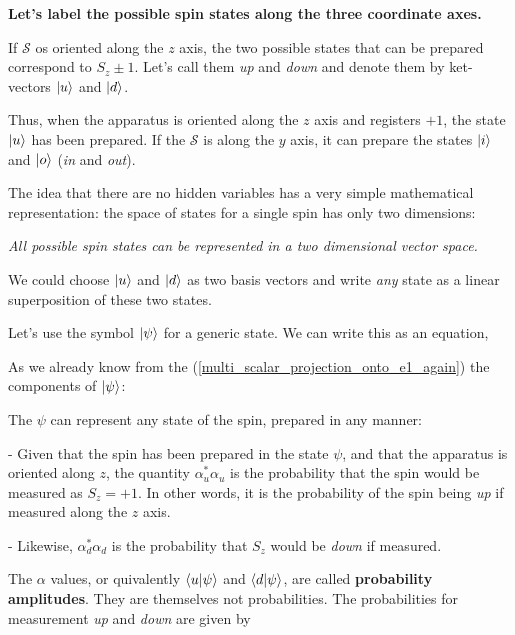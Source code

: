 \documentclass{article}
\begin{document}
\textbf{Let's label the possible spin states along the three coordinate axes.}

If $\mathcal{S}$ os oriented along the $z$ axis, the two possible states that can be prepared correspond to $S_z \pm 1$. Let's call them \textit{up} and \textit{down} and denote them by ket-vectors $\ket{u}$ and $\ket{d}$. 

Thus, when the apparatus is oriented along the $z$ axis and registers $+1$, the state $\ket{u}$ has been prepared. If the $\mathcal{S}$ is along the $y$ axis, it can prepare the states $\ket{i}$ and $\ket{o}$ (\textit{in} and \textit{out}).

The idea that there are no hidden variables has a very simple mathematical representation: the space of states for a single spin has only two dimensions:

\textit{All possible spin states can be represented in a two dimensional vector space.}

We could choose $\ket{u}$ and $\ket{d}$ as two basis vectors and write \textit{any} state as a linear superposition of these two states.

Let's use the symbol $\ket{\psi}$ for a generic state. We can write this as an equation,


As we already know from the (\ref{multi_scalar_projection_onto_e1_again}) the components of $\ket{\psi}$:




The $\psi$ can represent any state of the spin, prepared in any manner:

- Given that the spin has been prepared in the state $\psi$, and that the apparatus is oriented along $z$, the quantity $\alpha_{u}^{*} \alpha_u$ is the probability that the spin would be measured as $S_z = +1$. In other words, it is the probability of the spin being \textit{up} if measured along the $z$ axis.

- Likewise, $\alpha_{d}^{*} \alpha_d$ is the probability that $S_z$ would be \textit{down} if measured.

The $\alpha$ values, or quivalently $\bra{u}\ket{\psi}$ and $\bra{d}\ket{\psi}$, are called \textbf{probability amplitudes}. They are themselves not probabilities. The probabilities for measurement \textit{up} and \textit{down} are given by
\end{document}
